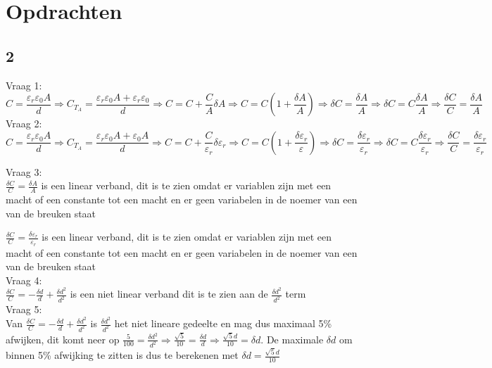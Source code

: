 \section{Opdrachten}
\subsection{2}
    Vraag 1:\\
    \begin{equation} \label{eq:a}
        C=\frac{\varepsilon_r\varepsilon_0A}{d}\Rightarrow C_{T_A}=\frac{\varepsilon_r \varepsilon_0A + \varepsilon_r \varepsilon_0}{d} \Rightarrow C = C + \frac{C}{A}\delta A \Rightarrow C=C(1+\frac{\delta A}{A}) \Rightarrow \delta C=\frac{\delta A}{A} \Rightarrow \delta C = C\frac{\delta A}{A}\Rightarrow \frac{\delta C}{C}=\frac{\delta A}{A}
    \end{equation}
    Vraag 2:\\
    \begin{equation} \label{eq:epsilonR}
        C=\frac{\varepsilon_r\varepsilon_0A}{d}\Rightarrow C_{T_A}=\frac{\varepsilon_r \varepsilon_0A + \varepsilon_0A}{d} \Rightarrow C = C + \frac{C}{\varepsilon_r}\delta\varepsilon_r \Rightarrow C=C(1+\frac{\delta \varepsilon_r}{\varepsilon}) \Rightarrow \delta C=\frac{\delta \varepsilon_r}{\varepsilon_r} \Rightarrow \delta C = C\frac{\delta \varepsilon_r}{\varepsilon_r}\Rightarrow \frac{\delta C}{C}=\frac{\delta \varepsilon_r}{\varepsilon_r}
    \end{equation}

    \noindent
    Vraag 3:\\
    $\frac{\delta C}{C}=\frac{\delta A}{A}$ is een linear verband, dit is te zien omdat er variablen zijn met een macht of een constante tot een macht en er geen variabelen in de noemer van een van de breuken staat

    \noindent
    $\frac{\delta C}{C}=\frac{\delta \varepsilon_r}{\varepsilon_r}$ is een linear verband, dit is te zien omdat er variablen zijn met een macht of een constante tot een macht en er geen variabelen in de noemer van een van de breuken staat\\

    \noindent
    Vraag 4:\\
    $\frac{\delta C}{C}=-\frac{\delta d}{d}+\frac{\delta d^2}{d^2}$ is een niet linear verband dit is te zien aan de $\frac{\delta d^2}{d^2}$ term\\

    \noindent
    Vraag 5:\\
    Van $\frac{\delta C}{C}=-\frac{\delta d}{d}+\frac{\delta d^2}{d^2}$ is $\frac{\delta d^2}{d^2}$ het niet lineare gedeelte
    en mag dus maximaal 5\% afwijken, dit komt neer op $\frac{5}{100}=\frac{\delta d^2}{d^2}\Rightarrow\frac{\sqrt{5}}{10}=\frac{\delta d}{d}\Rightarrow \frac{\sqrt{5}d}{10}=\delta d$. De maximale 
    $\delta d$ om binnen 5\% afwijking te zitten is dus te berekenen met $\delta d=\frac{\sqrt{5}d}{10}$

